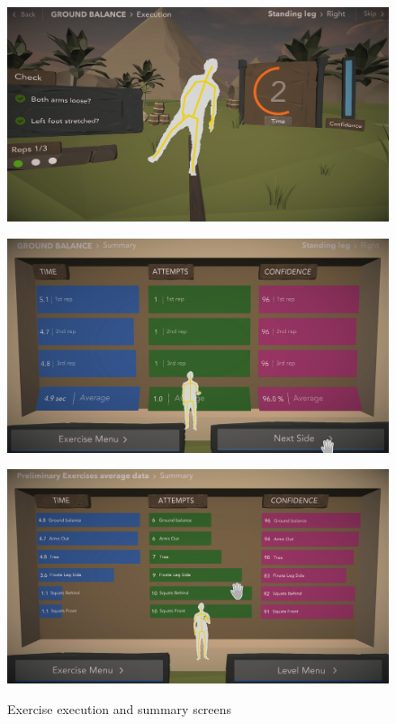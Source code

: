 \begin{figure}[htb]
	\centering
	\begin{minipage}[t]{1\linewidth}
		\centering
		\includegraphics[width=0.8\linewidth]{Pictures/5_Workflow/11_3_ExerciseExecutionRep}
		\label{fig:trickline}
	\end{minipage}
	\hfill
	\begin{minipage}[t]{0.49\linewidth}
		\centering
		\includegraphics[width=1\linewidth]{Pictures/5_Workflow/12_ExerciseSummary}
		\label{fig:jumpline}
	\end{minipage}
	\hfill
	\begin{minipage}[t]{0.49\linewidth}
		\centering
		\includegraphics[width=1\linewidth]{Pictures/5_Workflow/13_TierSummary}
		\label{fig:rodeoline}
	\end{minipage}
	\caption{Exercise execution and summary screens}
	\label{fig:slacklineVariation}
\end{figure}
